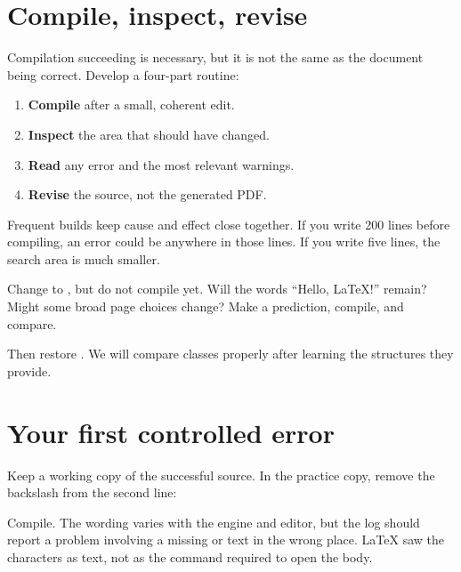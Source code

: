 \section{Compile, inspect, revise}

Compilation succeeding is necessary, but it is not the same as the document
being correct. Develop a four-part routine:

\begin{enumerate}
  \item \textbf{Compile} after a small, coherent edit.
  \item \textbf{Inspect} the area that should have changed.
  \item \textbf{Read} any error and the most relevant warnings.
  \item \textbf{Revise} the source, not the generated PDF.
\end{enumerate}

Frequent builds keep cause and effect close together. If you write 200 lines
before compiling, an error could be anywhere in those lines. If you write five
lines, the search area is much smaller.

\begin{pausepredict}
Change  to , but do not compile yet. Will the words
``Hello, \LaTeX{}!'' remain? Might some broad page choices change? Make a
prediction, compile, and compare.

Then restore . We will compare classes properly after learning
the structures they provide.
\end{pausepredict}

\section{Your first controlled error}

Keep a working copy of the successful source. In the practice copy, remove
the backslash from the second line:


Compile. The wording varies with the engine and editor, but the log should
report a problem involving a missing  or text in
the wrong place. \LaTeX{} saw the characters  as text,
not as the command required to open the body.

